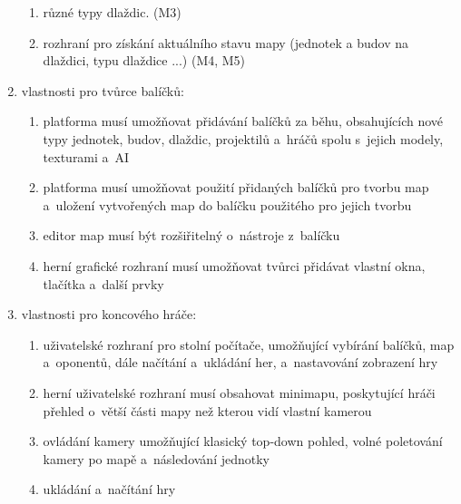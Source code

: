 \begin{enumerate}
\begin{enumerate}
			\item různé typy dlaždic. (M3)
			\item rozhraní pro získání aktuálního stavu mapy (jednotek a budov na dlaždici, typu dlaždice ...) (M4, M5)
		\end{enumerate}
	\item vlastnosti pro tvůrce balíčků:
		\begin{enumerate}
			\item platforma musí umožňovat přidávání balíčků za běhu, obsahujících nové typy jednotek, budov,  dlaždic, projektilů a~hráčů spolu s~jejich modely, texturami a~AI
			\item platforma musí umožňovat použití přidaných balíčků pro tvorbu map a~uložení vytvořených map do balíčku použitého pro jejich tvorbu
			\item editor map musí být rozšiřitelný o~nástroje z~balíčku
			\item herní grafické rozhraní musí umožňovat tvůrci přidávat vlastní okna, tlačítka a~další prvky
		\end{enumerate}
	\item vlastnosti pro koncového hráče:
		\begin{enumerate}
			\item uživatelské rozhraní pro stolní počítače, umožňující vybírání balíčků, map a~oponentů, dále načítání a~ukládání her, a~nastavování zobrazení hry
			\item herní uživatelské rozhraní musí obsahovat minimapu, poskytující hráči přehled o~větší části mapy než kterou vidí vlastní kamerou
			\item ovládání kamery umožňující klasický top-down pohled, volné poletování kamery po mapě a~následování jednotky
			\item ukládání a~načítání hry
		\end{enumerate}
\end{enumerate}
